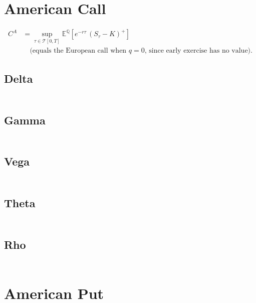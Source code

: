 \documentclass[12pt,a4paper]{article}
\begin{document}
\section{American Call}

\[
  \begin{aligned}
    C^{A} & = \sup_{\tau \in \mathcal{T}[0,T]} \mathbb{E}^{\mathbb{Q}}\!
    \left[ e^{-r \tau}\,(S_{\tau}-K)^{+} \right]                                                   \\
          & \quad \text{(equals the European call when $q=0$, since early exercise has no value).}
  \end{aligned}
\]

\subsection{Delta}
\[
  \begin{aligned}
  \end{aligned}
\]

\subsection{Gamma}
\[
  \begin{aligned}
  \end{aligned}
\]

\subsection{Vega}
\[
  \begin{aligned}
  \end{aligned}
\]

\subsection{Theta}
\[
  \begin{aligned}
  \end{aligned}
\]

\subsection{Rho}
\[
  \begin{aligned}
  \end{aligned}
\]

\section{American Put}
\end{document}
